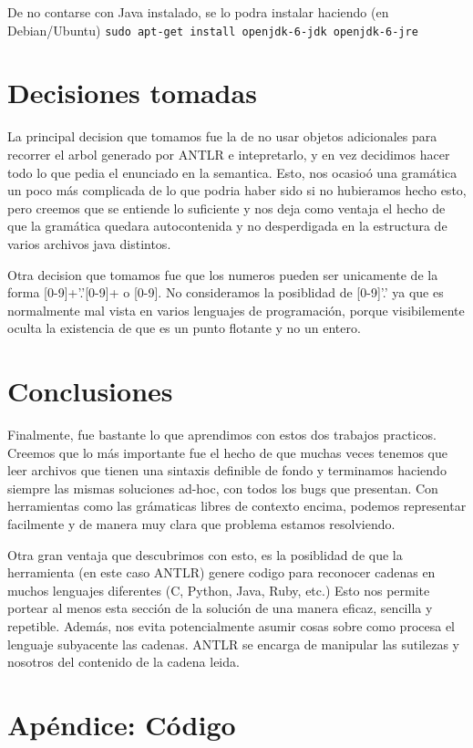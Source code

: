 \documentclass[a4paper]{article}
\begin{document}
De no contarse con Java instalado, se lo podra instalar haciendo (en Debian/Ubuntu)
\hbox{\texttt{sudo apt-get install openjdk-6-jdk openjdk-6-jre }}

\section{Decisiones tomadas}
La principal decision que tomamos fue la de no usar objetos adicionales para
recorrer el arbol generado por ANTLR e intepretarlo, y en vez decidimos hacer
todo lo que pedia el enunciado en la semantica. Esto, nos ocasio\'o una gram\'atica
un poco m\'as complicada de lo que podria haber sido si no hubieramos hecho esto,
pero creemos que se entiende lo suficiente y nos deja como ventaja el hecho
de que la gram\'atica quedara autocontenida y no desperdigada en la estructura
de varios archivos java distintos.

Otra decision que tomamos fue que los numeros pueden ser unicamente de la forma
[0-9]+'.'[0-9]+ o [0-9]. No consideramos  la posiblidad de [0-9]'.' ya que es
normalmente mal vista en varios lenguajes de programaci\'on, porque visibilemente
oculta la existencia de que es un punto flotante y no un entero.


\section{Conclusiones}
Finalmente, fue bastante lo que aprendimos con estos dos trabajos practicos.
Creemos que lo m\'as importante fue el hecho de que muchas veces tenemos que
leer archivos que tienen una sintaxis definible de fondo y terminamos haciendo
siempre las mismas soluciones ad-hoc, con todos los bugs que presentan. Con
herramientas como las gr\'amaticas libres de contexto encima, podemos representar
facilmente y de manera muy clara que problema estamos resolviendo.

Otra gran ventaja que descubrimos con esto, es la posiblidad de que la herramienta
(en este caso ANTLR) genere codigo para reconocer cadenas en muchos lenguajes
diferentes (C, Python, Java, Ruby, etc.) Esto nos permite portear al menos 
esta secci\'on de la soluci\'on de una manera eficaz, sencilla y repetible. 
Adem\'as, nos evita potencialmente asumir cosas sobre como procesa el lenguaje
subyacente las cadenas. ANTLR se encarga de manipular las sutilezas y nosotros
del contenido de la cadena leida.


\section{Ap\'endice: C\'odigo}
\end{document}

